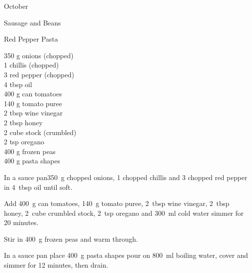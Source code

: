 \begin{menu}{October}
\begin{recipe}{2}{Sausage and Beans}
\begin{instructions}
    \end{instructions}
    \end{recipe}%
  
    \begin{recipe}{2}{Red Pepper Pasta}%
		\begin{ingredients}
		350 g onions (chopped) \\
	1  chillis (chopped) \\
	3  red pepper (chopped) \\
	4 tbsp oil  \\
	400 g can tomatoes  \\
	140 g tomato puree  \\
	2 tbsp wine vinegar  \\
	2 tbsp honey  \\
	2 cube stock (crumbled) \\
	2 tsp oregano  \\
	400 g frozen peas  \\
	400 g pasta shapes  \\
	
		\end{ingredients}
	
	
    \begin{instructions}
    \item 
        In a sauce pan350~g chopped onions,
        1 chopped chillis
        and
        3 chopped red pepper
        in
        4~tbsp  oil
        until soft.
      \item 
        Add
        400~g  can tomatoes,
        140~g  tomato puree,
        2~tbsp  wine vinegar,
        2~tbsp  honey,
        2~cube crumbled stock,
        2~tsp  oregano
        and
        300~ml  cold water
        simmer for 20 minutes.
      \item 
        Stir in
        400~g  frozen peas
        and warm through.
      \item 
    In a
    sauce pan
    place
    400~g  pasta shapes
    pour on
    800~ml  boiling water,
    cover and simmer for 12 minutes, then drain.
  
    \end{instructions}
    \end{recipe}%
  

\end{menu}
